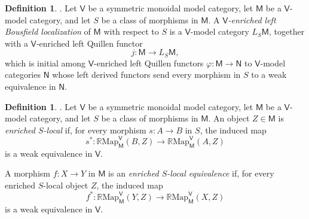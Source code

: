 \documentclass{amsart}
\newcommand{\cat}[1]{\mathsf{#1}}
\newcommand{\Map}{\mathrm{Map}}
\theoremstyle{definition}
\newtheorem{definition}[equation]{Definition}
\numberwithin{equation}{subsection}
\numberwithin{subsubsection}{subsection}
\begin{document}
\begin{definition}\label{def:enriched.left.bousfield.localization}
  \textnormal{\cite[Definition~4.42]{Bar10}}.
  Let \(\cat{V}\) be a symmetric monoidal model category, let
  \(\cat{M}\) be a \(\cat{V}\)-model category, and let \(S\) be a class of
  morphisms in \(\cat{M}\). A \emph{\(\cat{V}\)-enriched left Bousfield
  localization} of \(\cat{M}\) with respect to \(S\) is a
  \(\cat{V}\)-model category \(L_S\cat{M}\), together with a
  \(\cat{V}\)-enriched left Quillen functor
  \[
    j:\cat{M}\longrightarrow L_S\cat{M},
  \]
  which is initial among \(\cat{V}\)-enriched left Quillen functors
  \(\varphi:\cat{M}\to\cat{N}\) to \(\cat{V}\)-model categories \(\cat{N}\)
  whose left derived functors send every morphism in \(S\) to a weak
  equivalence in \(\cat{N}\).
\end{definition}

\begin{definition}\label{def:enriched.s.local.objects.equivalences}
  \textnormal{\cite[Definition~4.45]{Bar10}}.
  Let \(\cat{V}\) be a symmetric monoidal model category, let \(\cat{M}\) be a
  \(\cat{V}\)-model category, and let \(S\) be a class of morphisms in
  \(\cat{M}\). An object \(Z\in\cat{M}\) is \emph{enriched \(S\)-local} if,
  for every morphism \(s:A\to B\) in \(S\), the induced map
  \[
    s^{*}:
    \mathbb{R}\Map_{\cat{M}}^{\cat{V}}(B,Z)
    \longrightarrow
    \mathbb{R}\Map_{\cat{M}}^{\cat{V}}(A,Z)
  \]
  is a weak equivalence in \(\cat{V}\).

  A morphism \(f:X\to Y\) in \(\cat{M}\) is an
  \emph{enriched \(S\)-local equivalence} if, for every enriched
  \(S\)-local object \(Z\), the induced map
  \[
    f^{*}:
    \mathbb{R}\Map_{\cat{M}}^{\cat{V}}(Y,Z)
    \longrightarrow
    \mathbb{R}\Map_{\cat{M}}^{\cat{V}}(X,Z)
  \]
  is a weak equivalence in \(\cat{V}\).
\end{definition}
\end{document}

